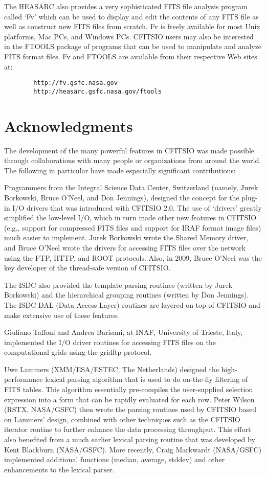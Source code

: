 \documentclass[11pt]{book}
\begin{document}
The HEASARC also provides a very sophisticated FITS file analysis
program called `Fv' which can be used to display and edit the contents
of any FITS file as well as construct new FITS files from scratch.
Fv is freely available for
most Unix platforms, Mac PCs, and Windows PCs.
CFITSIO users may also be interested in the FTOOLS package of programs
that can be used to manipulate and analyze FITS format files.
Fv and FTOOLS are available from their respective Web sites at:

\begin{verbatim}
        http://fv.gsfc.nasa.gov
        http://heasarc.gsfc.nasa.gov/ftools
\end{verbatim}


\section{Acknowledgments}

The development of the many powerful features in CFITSIO was made
possible through collaborations with many people or organizations from
around the world.  The following in particular have made especially
significant contributions:

Programmers from the Integral Science Data Center, Switzerland (namely,
Jurek Borkowski, Bruce O'Neel, and Don Jennings), designed the concept
for the plug-in I/O drivers that was introduced with CFITSIO 2.0.  The
use of `drivers' greatly simplified  the low-level I/O, which in turn
made other new features in CFITSIO (e.g., support for compressed FITS
files and support for IRAF format image files) much easier to
implement.  Jurek Borkowski wrote the Shared Memory driver, and Bruce
O'Neel wrote the drivers for accessing FITS files over the network
using the FTP, HTTP, and ROOT protocols.  Also, in 2009, Bruce O'Neel
was the key developer of the thread-safe version of CFITSIO.

The ISDC also provided the template parsing routines (written by Jurek
Borkowski) and the hierarchical grouping routines (written by Don
Jennings).  The ISDC DAL (Data Access Layer) routines are layered on
top of CFITSIO and make extensive use of these features.

Giuliano Taffoni and Andrea Barisani, at INAF, University of Trieste,
Italy, implemented the I/O driver routines for accessing FITS files
on the computational grids using the gridftp protocol.

Uwe Lammers (XMM/ESA/ESTEC, The Netherlands) designed the
high-performance lexical parsing algorithm that is used to do
on-the-fly filtering of FITS tables.  This algorithm essentially
pre-compiles the user-supplied selection expression into a form that
can be rapidly evaluated for each row.  Peter Wilson (RSTX, NASA/GSFC)
then wrote the parsing routines used by CFITSIO based on Lammers'
design, combined with other techniques such as the CFITSIO iterator
routine to further enhance the data processing throughput.  This effort
also benefited from a much earlier lexical parsing routine that was
developed by Kent Blackburn (NASA/GSFC). More recently, Craig Markwardt
(NASA/GSFC) implemented additional functions (median, average, stddev)
and other enhancements to the lexical parser.
\end{document}
